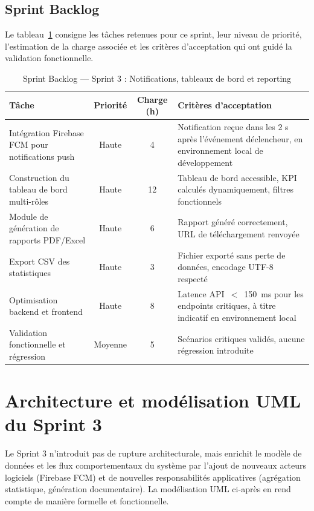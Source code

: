 \subsection*{Sprint Backlog}
\label{sec:sprint_backlog3}

Le tableau~\ref{tab:sprint_backlog3} consigne les tâches retenues pour ce sprint, leur niveau de priorité, l'estimation de la charge associée et les critères d'acceptation qui ont guidé la validation fonctionnelle.

\begin{table}[H]
    \centering
    \caption{Sprint Backlog — Sprint 3 : Notifications, tableaux de bord et reporting}
    \begin{tabular}{|p{4.8cm}|c|c|p{5.2cm}|}
        \hline
        \textbf{Tâche} & \textbf{Priorité} & \textbf{Charge (h)} & \textbf{Critères d'acceptation} \\ \hline
        Intégration Firebase FCM pour notifications push & Haute & 4 & Notification reçue dans les 2 s après l'événement déclencheur, en environnement local de développement \\ \hline
        Construction du tableau de bord multi-rôles & Haute & 12 & Tableau de bord accessible, KPI calculés dynamiquement, filtres fonctionnels \\ \hline
        Module de génération de rapports PDF/Excel & Haute & 6 & Rapport généré correctement, URL de téléchargement renvoyée \\ \hline
        Export CSV des statistiques & Haute & 3 & Fichier exporté sans perte de données, encodage UTF-8 respecté \\ \hline
        Optimisation backend et frontend & Haute & 8 & Latence API~$<$~150~ms pour les endpoints critiques, à titre indicatif en environnement local \\ \hline
        Validation fonctionnelle et régression & Moyenne & 5 & Scénarios critiques validés, aucune régression introduite \\ \hline
    \end{tabular}
    \label{tab:sprint_backlog3}
\end{table}

\section{Architecture et modélisation UML du Sprint 3}
\label{sec:uml_sprint3}

Le Sprint 3 n'introduit pas de rupture architecturale, mais enrichit le modèle de données et les flux comportementaux du système par l'ajout de nouveaux acteurs logiciels (Firebase FCM) et de nouvelles responsabilités applicatives (agrégation statistique, génération documentaire). La modélisation UML ci-après en rend compte de manière formelle et fonctionnelle.

